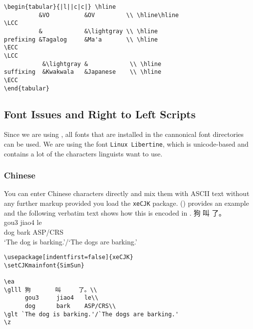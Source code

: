 \begin{verbatim}
\begin{tabular}{|l||c|c|} \hline
          &VO          &OV         \\ \hline\hline
\LCC
          &            &\lightgray \\ \hline
prefixing &Tagalog     &Ma'a       \\ \hline
\ECC
\LCC
           &\lightgray &            \\ \hline
suffixing  &Kwakwala   &Japanese    \\ \hline
\ECC
\end{tabular}
\end{verbatim}



\subsection{Font Issues and Right to Left Scripts}

Since we are using \xelatex, all fonts that are installed in the cannonical font directories can be
used. We are using the font \texttt{Linux Libertine}, which is unicode-based and contains a lot of
the characters linguists want to use.

\subsubsection{Chinese}

You can enter Chinese characters directly and mix them with ASCII text without any further markup
provided you load the \texttt{xeCJK} package. () provides an example and the following
verbatim text shows how this is encoded in \xelatex.
\ea
\glll 狗       叫     了。\\
      gou3     jiao4   le\\
      dog      bark    ASP/CRS\\
\glt `The dog is barking.'/`The dogs are barking.'
\z

\begin{verbatim}
\usepackage[indentfirst=false]{xeCJK}
\setCJKmainfont{SimSun}

\ea
\glll 狗       叫     了。\\
      gou3     jiao4   le\\
      dog      bark    ASP/CRS\\
\glt `The dog is barking.'/`The dogs are barking.'
\z
\end{verbatim}



